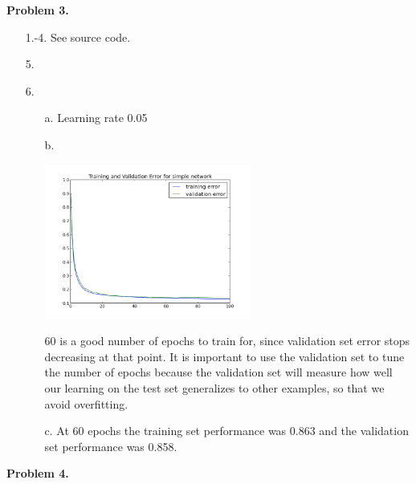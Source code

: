 \documentclass[12pt]{amsart}
\theoremstyle{remark}
\begin{document}
\noindent \textbf{Problem 3.}

\begin{itemize}
\item[1.-4.] See source code.

\item[5.]

\item[6.]
\begin{itemize}
\item[a.] Learning rate 0.05
\item[b.] 

\includegraphics[height =2in]{simple100_005}

60 is a good number of epochs to train for, since validation set error stops decreasing at that point. It is important to use the validation set to tune the number of epochs because the validation set will measure how well our learning on the test set generalizes to other examples, so that we avoid overfitting.

\item[c.] At 60 epochs the training set performance was 0.863 and the validation set performance was 0.858.

\end{itemize}

\end{itemize}
\noindent \textbf{Problem 4.}
\end{document}
